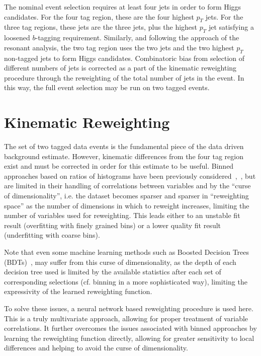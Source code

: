 The nominal event selection requires at least four jets in order to form Higgs
candidates. For the four tag region, these are the four highest $p_{T}$ \btagged 
jets. For the three tag regions, these jets are the three \btagged jets, plus the 
highest $p_{T}$ jet satisfying a loosened $b$-tagging requirement. Similarly, and following 
the approach of the resonant analysis, the two tag region uses the two \btagged jets 
and the two highest $p_{T}$ non-tagged jets to form Higgs candidates. Combinatoric bias 
from selection of different numbers of \btagged jets is corrected as a part of the kinematic 
reweighting procedure through the reweighting of the total number of jets in the event. In this way, 
the full event selection may be run on two tagged events. 

\section{Kinematic Reweighting}
The set of two tagged data events is the fundamental piece of the data driven
background estimate. However, kinematic differences from the four tag region
exist and must be corrected in order for this estimate to be useful. Binned 
approaches based on ratios of histograms have been previously considered~\cite{EXOT-2016-31},~\cite{HDBS-2018-18}, 
but are limited in their handling of correlations 
between variables and by the ``curse of dimensionality'', i.e. the dataset
becomes sparser and sparser in ``reweighting space'' as the number of dimensions
in which to reweight increases, limiting the number of variables used for reweighting. 
This leads either to an unstable fit result (overfitting with finely grained bins) or a 
lower quality fit result (underfitting with coarse bins).

Note that even some machine learning methods such as Boosted Decision Trees (BDTs)~\cite{BDT-RW}, may suffer
from this curse of dimensionality, as the depth of each decision tree used is limited by 
the available statistics after each set of corresponding selections (cf. binning in a 
more sophisticated way), limiting the expressivity of the learned reweighting function.

To solve these issues, a neural network based reweighting procedure is used
here. This is a truly multivariate approach, allowing for proper treatment of
variable correlations. It further overcomes the issues associated with binned
approaches by learning the reweighting function directly, allowing for greater
sensitivity to local differences and helping to avoid the curse of
dimensionality.


